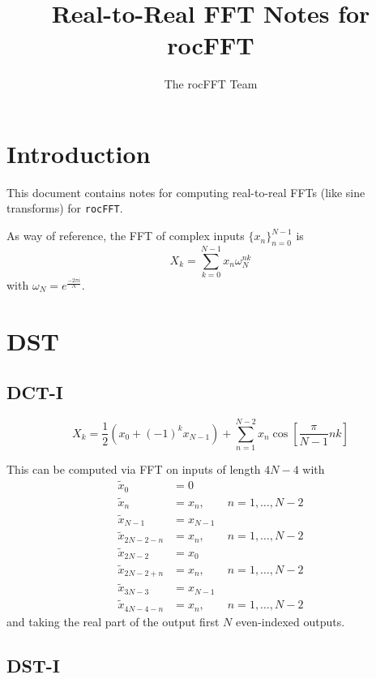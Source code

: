 \documentclass[12pt]{article}
\title{Real-to-Real FFT Notes for rocFFT}
\author{The rocFFT Team}
\renewcommand{\(}{\left(}
\renewcommand{\)}{\right)}
\begin{document}
\maketitle

\section{Introduction}

This document contains notes for computing real-to-real FFTs (like
sine transforms) for \texttt{rocFFT}.


As way of reference, the FFT of complex inputs $\{x_n\}_{n=0}^{N-1}$
is
\begin{dmath}
  X_k = \sum_{k=0}^{N-1} x_n \omega_N^{nk}
\end{dmath}
with $\omega_N=e^{\frac{-2 \pi i}{N}}$.


\section{DST}

\subsection{DCT-I}

\begin{dmath}
  X_k = \frac{1}{2}\( x_0 + \(-1\)^k x_{N-1}\)
  + \sum_{n=1}^{N-2} x_n \cos\left[ \frac{\pi}{N-1} n k \right]
\end{dmath}

This can be computed via FFT on inputs of length $4N-4$ with
\begin{align}
  \tilde{x}_0 &= 0 \\
  \tilde{x}_n &= x_n, \qquad n = 1, \dots, N-2\\
  \tilde{x}_{N-1} &= x_{N-1}\\
  \tilde{x}_{2N-2-n} &= x_n, \qquad n = 1, \dots, N-2\\
  \tilde{x}_{2N-2} &= x_{0}\\
  \tilde{x}_{2 N - 2 + n} &= x_n, \qquad n = 1, \dots, N-2 \\
  \tilde{x}_{3N-3} &= x_{N-1}\\
  \tilde{x}_{4  N - 4 - n} &= x_n, \qquad n = 1, \dots, N-2
\end{align}
and taking the real part of the output first $N$ even-indexed outputs.

\subsection{DST-I}
\end{document}
